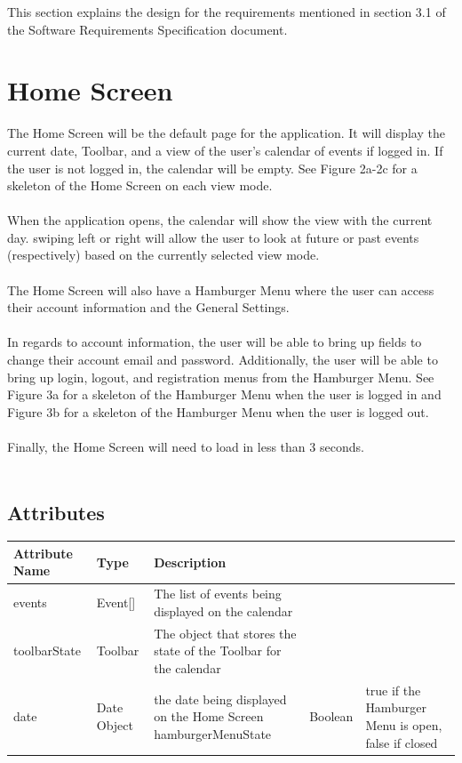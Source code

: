 \documentclass{scrreprt}
\begin{document}
This section explains the design for the requirements mentioned in section 3.1 of the Software Requirements Specification document.

\section{Home Screen}

The Home Screen will be the default page for the application.  It will display the current date, Toolbar, and a view of the user's calendar of events if logged in.  If the user is not logged in, the calendar will be empty. See Figure 2a-2c for a skeleton of the Home Screen on each view mode.\\
\\
When the application opens, the calendar will show the view with the current day.  swiping left or right will allow the user to look at future or past events (respectively) based on the currently selected view mode.\\
\\
The Home Screen will also have a Hamburger Menu where the user can access their account information and the General Settings.\\
\\
In regards to account information, the user will be able to bring up fields to change their account email and password.  Additionally, the user will be able to bring up login, logout, and registration menus from the Hamburger Menu.  See Figure 3a for a skeleton of the Hamburger Menu when the user is logged in and Figure 3b for a skeleton of the Hamburger Menu when the user is logged out.\\
\\
Finally, the Home Screen will need to load in less than 3 seconds. \\
\\

\subsection{Attributes}

\begin{center}
\begin{longtable}{ | p{5cm} | p{5cm} | p{5cm} | }
\hline
\textbf{Attribute Name} & \textbf{Type} & \textbf{Description} \\
\hline
events & Event[] & The list of events being displayed on the calendar \\
\hline
toolbarState & Toolbar & The object that stores the state of the Toolbar for the calendar \\
\hline
date & Date Object & the date being displayed on the Home Screen
\hline
hamburgerMenuState & Boolean & true if the Hamburger Menu is open, false if closed \\
\hline
\end{longtable}
\end{center}
\end{document}
